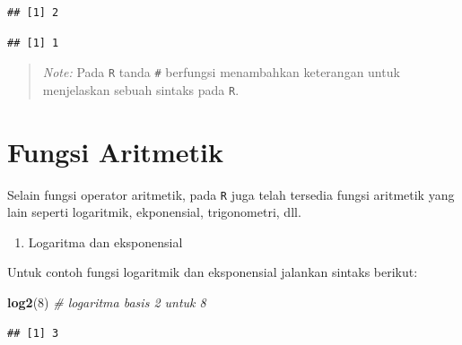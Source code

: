 \documentclass[]{book}
\newenvironment{Shaded}{\begin{snugshade}}{\end{snugshade}}
\newcommand{\KeywordTok}[1]{\textcolor[rgb]{0.13,0.29,0.53}{\textbf{#1}}}
\newcommand{\DecValTok}[1]{\textcolor[rgb]{0.00,0.00,0.81}{#1}}
\newcommand{\CommentTok}[1]{\textcolor[rgb]{0.56,0.35,0.01}{\textit{#1}}}
\newcommand{\OperatorTok}[1]{\textcolor[rgb]{0.81,0.36,0.00}{\textbf{#1}}}
\newcommand{\NormalTok}[1]{#1}
\providecommand{\tightlist}{%
  \setlength{\itemsep}{0pt}\setlength{\parskip}{0pt}}
\begin{document}
\begin{Shaded}
\end{Shaded}

\begin{verbatim}
## [1] 2
\end{verbatim}

\begin{Shaded}
\end{Shaded}

\begin{verbatim}
## [1] 1
\end{verbatim}

\begin{quote}
\emph{Note: } Pada \texttt{R} tanda \texttt{\#} berfungsi menambahkan
keterangan untuk menjelaskan sebuah sintaks pada \texttt{R}.
\end{quote}

\section{Fungsi Aritmetik}\label{fungsi-aritmetik}

Selain fungsi operator aritmetik, pada \texttt{R} juga telah tersedia
fungsi aritmetik yang lain seperti logaritmik, ekponensial,
trigonometri, dll.

\begin{enumerate}
\def\labelenumi{\arabic{enumi}.}
\tightlist
\item
  Logaritma dan eksponensial
\end{enumerate}

Untuk contoh fungsi logaritmik dan eksponensial jalankan sintaks
berikut:

\begin{Shaded}
\begin{Highlighting}[]
\KeywordTok{log2}\NormalTok{(}\DecValTok{8}\NormalTok{) }\CommentTok{# logaritma basis 2 untuk 8}
\end{Highlighting}
\end{Shaded}

\begin{verbatim}
## [1] 3
\end{verbatim}
\end{document}
